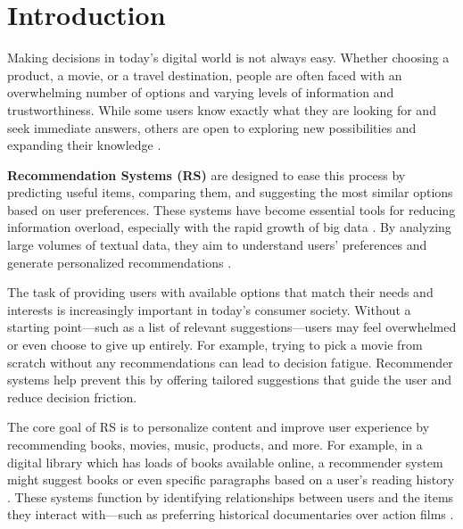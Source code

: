 \documentclass{llncs}
\begin{document}
\section{Introduction}
Making decisions in today’s digital world is not always easy. Whether choosing a product, a movie, or a travel destination, people are often faced with an overwhelming number of options and varying levels of information and trustworthiness. While some users know exactly what they are looking for and seek immediate answers, others are open to exploring new possibilities and expanding their knowledge \cite{Blanco201333}.

\textbf{Recommendation Systems (RS)} are designed to ease this process by predicting useful items, comparing them, and suggesting the most similar options based on user preferences. These systems have become essential tools for reducing information overload, especially with the rapid growth of big data \cite{Haruna2017}. By analyzing large volumes of textual data, they aim to understand users’ preferences and generate personalized recommendations \cite{Yan2024}.

The task of providing users with available options that match their needs and interests is increasingly important in today’s consumer society. Without a starting point—such as a list of relevant suggestions—users may feel overwhelmed or even choose to give up entirely. For example, trying to pick a movie from scratch without any recommendations can lead to decision fatigue. Recommender systems help prevent this by offering tailored suggestions that guide the user and reduce decision friction.


The core goal of RS is to personalize content and improve user experience by recommending books, movies, music, products, and more. For example, in a digital library which has loads of books available online, a recommender system might suggest books or even specific paragraphs based on a user’s reading history \cite{Zangerle2023}. These systems function by identifying relationships between users and the items they interact with—such as preferring historical documentaries over action films \cite{pub.1022525812}.
\end{document}
